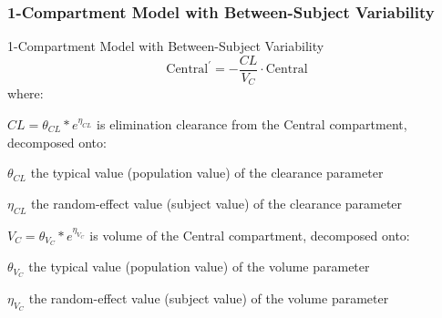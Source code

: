 \subsubsection{1-Compartment Model with Between-Subject Variability}
\begin{frame}{1-Compartment Model with Between-Subject Variability}
    $$
        \text{Central}^{\prime} = -\frac{CL}{V_C} \cdot \text{Central}
    $$
    where:
    \begin{vfilleditems}
        \item $CL = \theta_{CL} * e^{\eta_{CL}}$ is elimination clearance from the Central compartment,
        decomposed onto:
        \begin{vfilleditems}
            \item $\theta_{CL}$ the typical value (population value) of the clearance parameter
            \item $\eta_{CL}$ the random-effect value (subject value) of the clearance parameter
        \end{vfilleditems}
        \item $V_C = \theta_{V_C} * e^{\eta_{V_C}}$ is volume of the Central compartment,
        decomposed onto:
        \begin{vfilleditems}
            \item $\theta_{V_C}$ the typical value (population value) of the volume parameter
            \item $\eta_{V_C}$ the random-effect value (subject value) of the volume parameter
        \end{vfilleditems}
    \end{vfilleditems}
\end{frame}